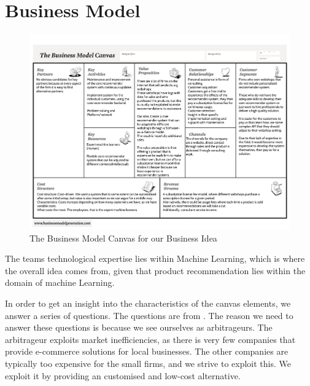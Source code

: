 \section{Business Model}
\begin{figure}
	\centering
	\includegraphics[width = \textwidth]{figures/business-model-canvas}
	\caption{The Business Model Canvas for our Business Idea}
	\label{fig:BusinessModelCanvas}
\end{figure}

The teams technological expertise lies within Machine Learning, which is where the overall idea comes from, given that product recommendation lies within the domain of machine Learning.

In order to get an insight into the characteristics of the canvas elements, we answer a series of questions. 
The questions are from \citep[pg. 40-55]{book:jrose}.
The reason we need to answer these questions is because we see ourselves as arbitrageurs.
The arbitrageur exploits market inefficiencies, as there is very few companies that provide e-commerce solutions for local businesses. 
The other companies are typically too expensive for the small firms, and we strive to exploit this.
We exploit it by providing an customised and low-cost alternative.

